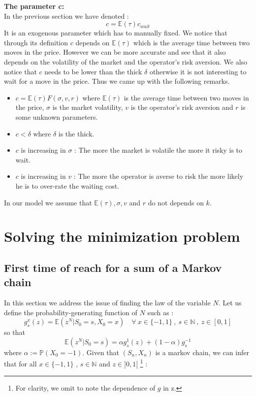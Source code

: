 \documentclass{article}
\begin{document}
\textbf{The parameter c:}\\
In the previous section we have denoted :
$$
	c = \mathbb{E}(\tau) c_{wait}
$$
It is an exogenous parameter which has to manually fixed. We notice that through its definition $c$ depends on $\mathbb{E}(\tau)$ which is the average time between two moves in the price. However we can be more accurate and see that it also depends on the volatility of the market and the operator's risk aversion. We also notice that $c$ needs to be lower than the thick $\delta$ otherwise it is not interesting to wait for a move in the price.
Thus we came up with the following remarks.
\begin{itemize}
\item $c = \mathbb{E}(\tau) F(\sigma,v,r)$ where $ \mathbb{E}(\tau)$ is the average time between two moves in the price, $\sigma$ is the market volatility, $v$ is the operator's risk aversion and $r$ is some unknown parameters. 
\item $c<\delta$ where $\delta$ is the thick.
\item $c$ is increasing in $\sigma$ : The more the market is volatile the more it risky is to wait.
\item $c$ is increasing in $v$ : The more the operator is averse to risk the more likely he is to over-rate the waiting cost. 
\end{itemize}
In our model we assume that $\mathbb{E}(\tau) , \sigma, v
$ and $r$ do not depends on $k$.

\newpage
\section{Solving the minimization problem}
\subsection{First time of reach for a sum of a Markov chain}
In this section we address the issue of finding the law of the variable $N$. Let us define the  probability-generating function of $N$ such as :
$$ g_{s}^{x}(z) = \mathbb{E}(z^{N} | S_0=s, X_0=x) \quad \forall \ x \in \{-1,1\} \ , \ s \in \mathbb{N} \ , \ z \in [0,1]  $$
so that
$$\mathbb{E}(z^{N} | S_0=s) = \alpha  g_{s}^{1}(z) + (1-\alpha) g_{s}^{-1} $$
where $\alpha := \mathbb{P}(X_0 = -1)$.
Given that $(S_n, X_n)$ is a markov chain, we can infer that for all $x \in \{-1,1\}$ , $s \in \mathbb{N}$ and $z \in ]0,1[$ \footnote{For clarity, we omit to note the dependence of $g$ in z.} :
\end{document}
